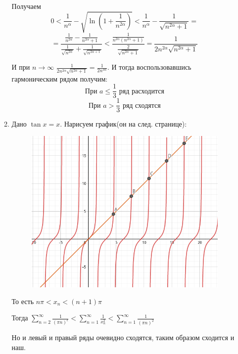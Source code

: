 \documentclass[11pt]{article}
\begin{document}
\begin{enumerate}
\begin{enumerate}
			Получаем 
			$$0<\frac{1}{n^{\alpha}}-\sqrt{\ln\left(1+\frac{1}{n^{2\alpha}}\right)}<\frac{1}{n^\alpha}-\frac{1}{\sqrt{n^{2\alpha}+1}}=$$
			$$=\frac{\frac{1}{n^{2\alpha}}-\frac{1}{n^{2\alpha}+1}}{\frac{1}{\sqrt{n^{2\alpha}}}+\frac{1}{\sqrt{n^{2\alpha+1}}}}<\frac{\frac{1}{n^{2\alpha}(n^{2\alpha}+1)}}{\frac{2}{\sqrt{n^{2\alpha}+1}}}=\frac{1}{2n^{2\alpha}\sqrt{n^{2\alpha}+1}}$$
			
			И при $n\to\infty$ $\frac{1}{2n^{2\alpha}\sqrt{n^{2\alpha}+1}}=\frac{1}{2n^{3\alpha}}$. И тогда воспользовавшись гармоническим рядом получим:
			$$\text{При } a\le\frac{1}{3}\text{ ряд расходится}$$
			$$\text{При } a>\frac{1}{3}\text{ ряд сходятся}$$
			\item Дано $\tan x=x$. Нарисуем график(он на след. странице):
			\begin{figure}
				\includegraphics[width=\linewidth]{pic1.png}
			\end{figure}
			То есть $n\pi<x_n<(n+1)\pi$
			
			Тогда $\sum_{n=2}^{\infty}\frac{1}{(\pi n)^\epsilon}<\sum_{n=1}^{\infty}\frac{1}{x_n^2}<\sum_{n=1}^{\infty}\frac{1}{(\pi n)^2}$
			
			Но и левый и правый ряды очевидно сходятся, таким образом сходится и наш.
		\end{enumerate}
		
	\end{enumerate}
\end{document}
